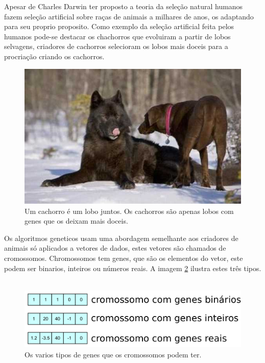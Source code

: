 \documentclass[10pt,a4paper]{article}
\begin{document}
Apesar de Charles Darwin ter proposto a teoria da seleção natural humanos fazem seleção artificial sobre raças de animais a milhares de anos, os adaptando para seu proprio proposito. Como exemplo da seleção artificial feita pelos humanos pode-se destacar os chachorros que evoluiram a partir de lobos selvagens, criadores de cachorros selecioram os lobos mais doceis para a procriação criando os cachorros.\\ 
\begin{figure}[H]
  \center
  \includegraphics[scale=0.6]{imgs/cachorroELobo.jpg}            
  \caption{Um cachorro é um lobo juntos. Os cachorros são apenas lobos com genes que os deixam mais doceis.}
  \label{fig:MostrandoOCruzamentoPorCorte}
\end{figure} 

Os algoritmos geneticos usam uma abordagem semelhante aos criadores de animais só aplicados a vetores de dados, estes vetores são chamados de cromossomos. Chromossomos tem genes, que são os elementos do vetor, este podem ser binarios, inteiros ou números reais. A imagem \ref{fig:ExemploDeVetores} ilustra estes três tipos.\\ \\
\begin{figure}[H]
  \center
  \includegraphics[scale=0.6]{imgs/tiposDeCromossomo.pdf}            
  \caption{Os varios tipos de genes que os cromossomos podem ter.}
  \label{fig:ExemploDeVetores}
\end{figure} 
\end{document}
